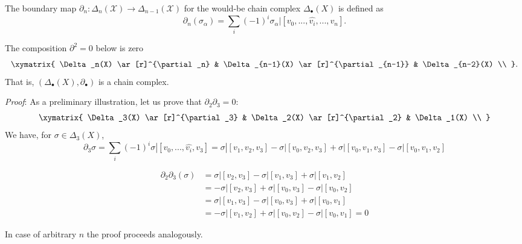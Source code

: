 \documentclass[11pt,a4paper]{report}
\begin{document}
		      The boundary map
		      $\partial_n: \Delta_n(\mathcal{X}) \rightarrow \Delta_{n-1}(\mathcal{X})$ for the would-be chain complex $\Delta_\bullet(X)$ is defined as
		      \[
		         \partial_n(\sigma_\alpha) = \sum\limits_i (-1)^i \sigma_\alpha | [v_0, ... ,\widehat{v_i}, ... , v_n].
              \]

            \begin{Lemma}\label{delta2}
             The composition $\partial^2=0$ below is zero
             \[
                \xymatrix{
                    \Delta_n(X)  \ar[r]^{\partial_n} &
                    \Delta_{n-1}(X)  \ar[r]^{\partial_{n-1}} &
                    \Delta_{n-2}(X)   \\ }.
             \]
             That is, $(\Delta_\bullet(X),\partial_\bullet)$ is a chain complex.
            \end{Lemma}

            \emph{Proof}: As a preliminary illustration, let us prove that $\partial_2 \partial_3 = 0$:
             \[
                \xymatrix{
                    \Delta_3(X)  \ar[r]^{\partial_3} &
                    \Delta_2(X)  \ar[r]^{\partial_2} &
                    \Delta_1(X)   \\ }
             \]
             We have, for $\sigma\in \Delta_3(X)$, \[\partial_3\sigma = \sum\limits_i (-1)^i \sigma | [v_0, ... ,\widehat{v_i}, v_3] =
             \sigma | [v_1, v_2, v_3] - \sigma | [v_0, v_2, v_3] + \sigma | [v_0, v_1, v_3] - \sigma | [v_0, v_1, v_2]\]


            \begin{equation}
                \begin{aligned}
                    \partial_2 \partial_3(\sigma) &= \sigma | [v_2, v_3] - \sigma | [v_1, v_3] + \sigma | [v_1, v_2] \\
                    &= -\sigma | [v_2, v_3] + \sigma | [v_0, v_3] - \sigma | [v_0, v_2] \\
                    &= \sigma | [v_1, v_3] - \sigma | [v_0, v_3] + \sigma | [v_0, v_1] \\
                    &= -\sigma | [v_1, v_2] + \sigma | [v_0, v_2] - \sigma | [v_0, v_1] = 0
                \end{aligned}
            \end{equation}

        In case of arbitrary $n$ the proof proceeds analogously.
\end{document}
